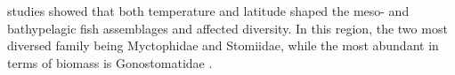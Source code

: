 
\citep{garcia2021} studies showed that both temperature and latitude shaped the meso- and bathypelagic fish assemblages and affected diversity. In this region, the two most diversed family being Myctophidae and Stomiidae, while the most abundant in terms of biomass is Gonostomatidae \citep{garcia2021}.